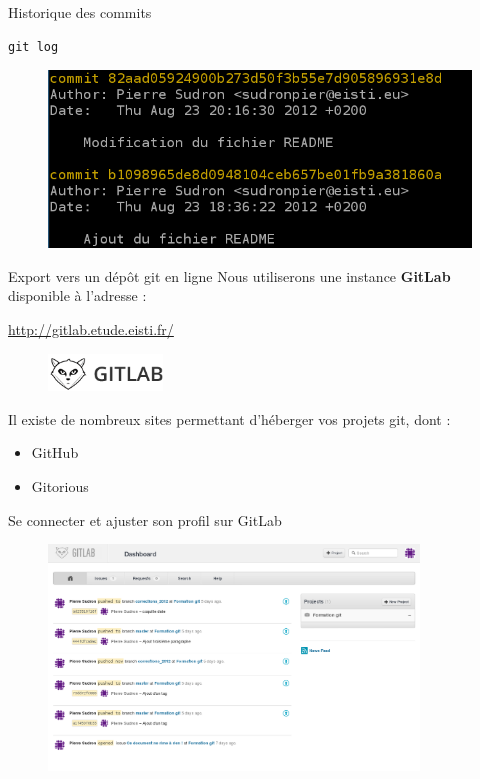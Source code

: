 \documentclass{beamer}
\begin{document}
\begin{frame}[fragile]{Historique des commits}
	\begin{lstlisting}[frame=single]
		git log
	\end{lstlisting}
		
	\begin{figure}
		\centering
		\includegraphics[width=11.5cm]{img/shot4}
	\end{figure}
\end{frame}

\begin{frame}{Export vers un dépôt git en ligne}
	Nous utiliserons une instance \textbf{GitLab} disponible à l'adresse :
	\begin{center}
	\url{http://gitlab.etude.eisti.fr/}
	\end{center}
	\begin{figure}
  		\centering
 		\includegraphics[height=1cm]{img/gitlab-logo}
	\end{figure}
	
	Il existe de nombreux sites permettant d'héberger vos projets git, dont :
	\begin{itemize}
		\item GitHub
		\item Gitorious
	\end{itemize}
\end{frame}

\begin{frame}{Se connecter et ajuster son profil sur GitLab}
	\begin{figure}
  		\centering
 		\includegraphics[height=6cm]{img/shot10}
	\end{figure}
\end{frame}
\end{document}
